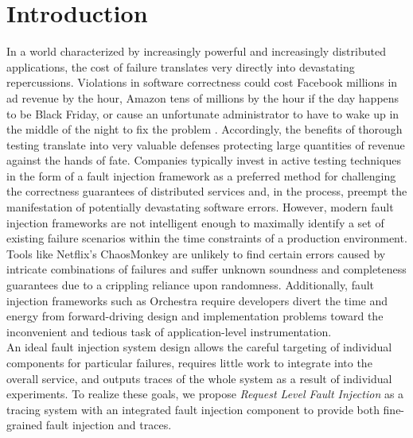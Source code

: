 

\section{Introduction}
In a world characterized by increasingly powerful and increasingly distributed applications, the cost of failure translates very directly into devastating repercussions. Violations in software correctness could cost Facebook millions in ad revenue by the hour, Amazon tens of millions by the hour if the day happens to be Black Friday, or cause an unfortunate administrator to have to wake up in the middle of the night to fix the problem . Accordingly, the benefits of thorough testing translate into very valuable defenses protecting large quantities of revenue against the hands of fate. Companies typically invest in active testing techniques in the form of a fault injection framework as a preferred method for challenging the correctness guarantees of distributed services and, in the process, preempt the manifestation of potentially devastating software errors. However, modern fault injection frameworks are not intelligent enough to maximally identify a set of existing failure scenarios within the time constraints of a production environment. Tools like Netflix's ChaosMonkey\cite{netflix:chaosmonkey} are unlikely to find certain errors caused by intricate combinations of failures\cite{alvaro:ldfi} and suffer unknown soundness and completeness guarantees due to a crippling reliance upon randomness. Additionally, fault injection frameworks such as Orchestra\cite{orchestra} require developers divert the time and energy from forward-driving design and implementation problems toward the inconvenient and tedious task of application-level instrumentation. 
\\ \indent
An ideal fault injection system design allows the careful targeting of individual components for particular failures, requires little work to integrate into the overall service, and outputs traces of the whole system as a result of individual experiments. To realize these goals, we propose \textit{Request Level Fault Injection} as a tracing system with an integrated fault injection component to provide both fine-grained fault injection and traces. 


